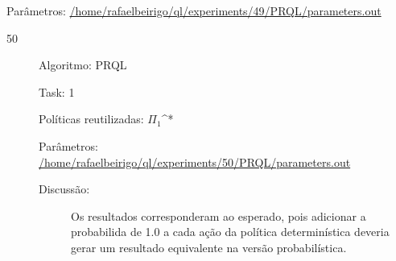 \documentclass[11pt]{article}
\begin{document}
\begin{description}
\begin{description}
\begin{description}
\begin{description}
\item[Parâmetros: \href{file:///home/rafaelbeirigo/ql/experiments/49/PRQL/parameters.out}{/home/rafaelbeirigo/ql/experiments/49/PRQL/parameters.out}]\label{sec-11.1.1.1.1.1.4}



\end{description}
\end{description}
\begin{description}

\item[50]\label{sec-11.1.1.1.1.2}


\begin{description}

\item[Algoritmo: PRQL]\label{sec-11.1.1.1.1.2.1}


\end{description}
\begin{description}

\item[Task: 1]\label{sec-11.1.1.1.1.2.2}


\end{description}
\begin{description}

\item[Políticas reutilizadas: $\Pi$$_1$^*]\label{sec-11.1.1.1.1.2.3}


\end{description}
\begin{description}

\item[Parâmetros: \href{file:///home/rafaelbeirigo/ql/experiments/50/PRQL/parameters.out}{/home/rafaelbeirigo/ql/experiments/50/PRQL/parameters.out}]\label{sec-11.1.1.1.1.2.4}


\end{description}
\begin{description}

\item[Discussão:]\label{sec-11.1.1.1.1.2.5}


Os resultados corresponderam ao esperado, pois adicionar a probabilida
de 1.0 a cada ação da política determinística deveria gerar um resultado
equivalente na versão probabilística.


\end{description}
\end{description}
\end{description}
\end{description}
\end{document}

